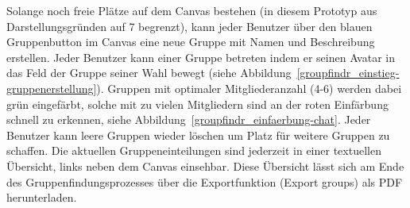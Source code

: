 Solange noch freie Plätze auf dem Canvas bestehen (in diesem Prototyp aus Darstellungsgründen auf 7 begrenzt), kann jeder Benutzer über den blauen Gruppenbutton im Canvas eine neue Gruppe mit Namen und Beschreibung erstellen. Jeder Benutzer kann einer Gruppe betreten indem er seinen Avatar in das Feld der Gruppe seiner Wahl bewegt (siehe Abbildung~\ref{groupfindr_einstieg-gruppenerstellung}). Gruppen mit optimaler Mitgliederanzahl (4-6) werden dabei grün eingefärbt, solche mit zu vielen Mitgliedern sind an der roten Einfärbung schnell zu erkennen, siehe Abbildung~\ref{groupfindr_einfaerbung-chat}. Jeder Benutzer kann leere Gruppen wieder löschen um Platz für weitere Gruppen zu schaffen. Die aktuellen Gruppeneinteilungen sind jederzeit in einer textuellen Übersicht, links neben dem Canvas einsehbar. Diese Übersicht lässt sich am Ende des Gruppenfindungsprozesses über die Exportfunktion (Export groups) als PDF herunterladen.
